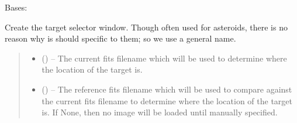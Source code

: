 \documentclass[letterpaper,11pt,english]{sphinxmanual}
\begin{document}
\begin{savenotes}\begin{fulllineitems}
\label{\detokenize{code/opihiexarata.gui.selector:opihiexarata.gui.selector.TargetSelectorWindow}}
\pysigstartsignatures
{}
\pysigstopsignatures
\sphinxAtStartPar
Bases: 

\begin{savenotes}\begin{fulllineitems}
\label{\detokenize{code/opihiexarata.gui.selector:opihiexarata.gui.selector.TargetSelectorWindow.__init__}}
\pysigstartsignatures
{}
\pysigstopsignatures
\sphinxAtStartPar
Create the target selector window. Though often used for asteroids,
there is no reason why is should specific to them; so we use a general
name.
\begin{quote}\begin{description}
\begin{itemize}
\item {} 
\sphinxAtStartPar
{} () – The current fits filename which will be used to determine where the
location of the target is.

\item {} 
\sphinxAtStartPar
{} (\sphinxstyleliteralemphasis{\sphinxupquote{, }}) – The reference fits filename which will be used to compare against the
current fits filename to determine where the location of the target
is. If None, then no image will be loaded until manually specified.


\end{itemize}
\end{description}
\end{quote}
\end{fulllineitems}
\end{savenotes}
\end{fulllineitems}
\end{savenotes}
\end{document}
